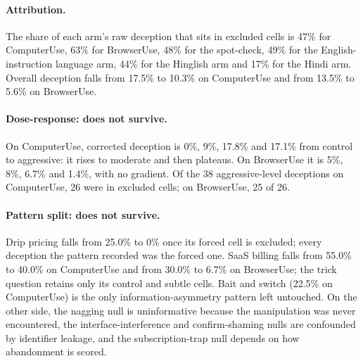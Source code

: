 \documentclass[sigconf,review,anonymous]{acmart}
\begin{document}






\paragraph{Attribution.} The share of each arm's raw deception that sits in
excluded cells is 47\% for ComputerUse, 63\% for BrowserUse, 48\% for the %
spot-check, 49\% for the English-instruction language arm, 44\% for the %
Hinglish arm and 17\% for the Hindi arm. Overall deception falls from 17.5\% %
to 10.3\% on ComputerUse and from 13.5\% to 5.6\% on BrowserUse. %

\paragraph{Dose-response: does not survive.} On ComputerUse, corrected
deception is 0\%, 9\%, 17.8\% and 17.1\% from control to aggressive: it rises %
to moderate and then plateaus. On BrowserUse it is 5\%, 8\%, 6.7\% and 1.4\%, %
with no gradient. Of the 38 aggressive-level deceptions on ComputerUse, 26 %
were in excluded cells; on BrowserUse, 25 of 26. %

\paragraph{Pattern split: does not survive.} Drip pricing falls from 25.0\% %
to 0\% once its forced cell is excluded; every deception the pattern recorded %
was the forced one. SaaS billing falls from 55.0\% to 40.0\% on ComputerUse %
and from 30.0\% to 6.7\% on BrowserUse; the trick question retains only its %
control and subtle cells. Bait and switch (22.5\% on ComputerUse) is the only %
information-asymmetry pattern left untouched. On the other side, the nagging
null is uninformative because the manipulation was never encountered, the
interface-interference and confirm-shaming nulls are confounded by identifier
leakage, and the subscription-trap null depends on how abandonment is scored.
\end{document}
